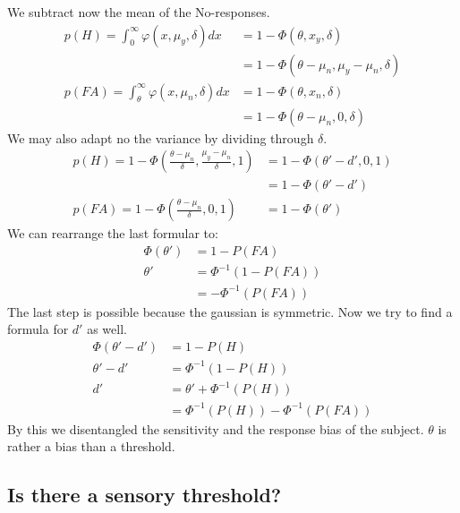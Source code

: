 \documentclass[../main/Notes.tex]{subfiles}
\begin{document}
We subtract now the mean of the No-responses. 
\begin{align*}
p(H) = \int_{0}^{\infty} \varphi \left( x,\mu_y,\delta \right)dx &= 1 - \Phi\left(\theta,x_y,\delta\right)\\
                                                                 &= 1 - \Phi\left(\theta-\mu_n,\mu_y-\mu_n,\delta \right)\\ 
p(FA) = \int_{\theta}^{\infty} \varphi \left( x,\mu_n,\delta \right)dx &= 1 - \Phi\left(\theta,x_n,\delta\right)\\
                                                                       &= 1 - \Phi\left(\theta-\mu_n,0,\delta \right)   
\end{align*}
We may also adapt no the variance by dividing through $\delta$.
\begin{align*}
p(H) = 1 - \Phi\left(\frac{\theta-\mu_n}{\delta},\frac{\mu_y-\mu_n}{\delta},1 \right) &= 1 - \Phi\left(\theta'-d',0,1\right)\\
                                                                                      &= 1 - \Phi\left(\theta'-d'\right)\\
p(FA) = 1 - \Phi\left(\frac{\theta-\mu_n}{\delta},0,1 \right) &= 1 - \Phi\left(\theta' \right) 
\end{align*}
We can rearrange the last formular to:
\begin{align*}
\Phi\left(\theta'\right) &= 1 - P(FA)\\
\theta'&=\Phi^{-1}\left(1-P(FA)\right)\\
&=-\Phi^{-1}\left(P(FA)\right)
\end{align*}
The last step is possible because the gaussian is symmetric. Now we try to find a formula for $d'$ as well. 
\begin{align*}
\Phi\left(\theta'-d'\right) &= 1 - P(H)\\
\theta'-d'&=\Phi^{-1}\left(1-P(H)\right)\\
d' &= \theta'+\Phi^{-1}\left(P(H)\right)\\
   &= \Phi^{-1}\left(P(H)\right)-\Phi^{-1}\left(P(FA)\right)
\end{align*}
By this we disentangled the sensitivity and the response bias of the subject. $\theta$ is rather a bias than a threshold.

\subsection{Is there a sensory threshold?}
\end{document}
